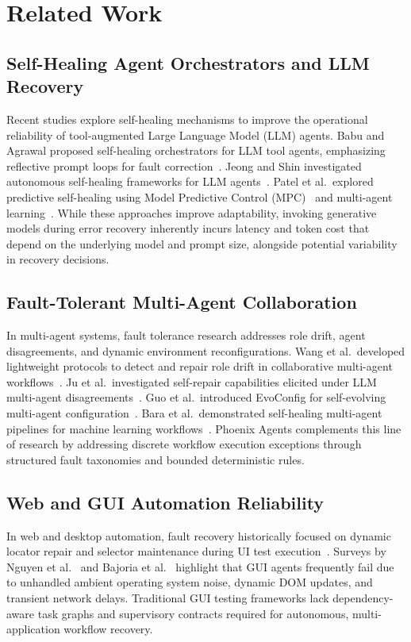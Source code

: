 \documentclass[conference]{IEEEtran}
\begin{document}
\section{Related Work}

\subsection{Self-Healing Agent Orchestrators and LLM Recovery}
Recent studies explore self-healing mechanisms to improve the operational reliability of tool-augmented Large Language Model (LLM) agents. Babu and Agrawal proposed self-healing orchestrators for LLM tool agents, emphasizing reflective prompt loops for fault correction~\cite{babu2026}. Jeong and Shin investigated autonomous self-healing frameworks for LLM agents~\cite{jeong2026}. Patel et al.\ explored predictive self-healing using Model Predictive Control (MPC)~\cite{patel2026a} and multi-agent learning~\cite{patel2026b}. While these approaches improve adaptability, invoking generative models during error recovery inherently incurs latency and token cost that depend on the underlying model and prompt size, alongside potential variability in recovery decisions.

\subsection{Fault-Tolerant Multi-Agent Collaboration}
In multi-agent systems, fault tolerance research addresses role drift, agent disagreements, and dynamic environment reconfigurations. Wang et al.\ developed lightweight protocols to detect and repair role drift in collaborative multi-agent workflows~\cite{wang2026}. Ju et al.\ investigated self-repair capabilities elicited under LLM multi-agent disagreements~\cite{ju2025}. Guo et al.\ introduced EvoConfig for self-evolving multi-agent configuration~\cite{guo2026}. Bara et al.\ demonstrated self-healing multi-agent pipelines for machine learning workflows~\cite{bara2026}. Phoenix Agents complements this line of research by addressing discrete workflow execution exceptions through structured fault taxonomies and bounded deterministic rules.

\subsection{Web and GUI Automation Reliability}
In web and desktop automation, fault recovery historically focused on dynamic locator repair and selector maintenance during UI test execution~\cite{garcia2026}. Surveys by Nguyen et al.~\cite{nguyen2025} and Bajoria et al.~\cite{bajoria2026} highlight that GUI agents frequently fail due to unhandled ambient operating system noise, dynamic DOM updates, and transient network delays. Traditional GUI testing frameworks lack dependency-aware task graphs and supervisory contracts required for autonomous, multi-application workflow recovery.
\end{document}
